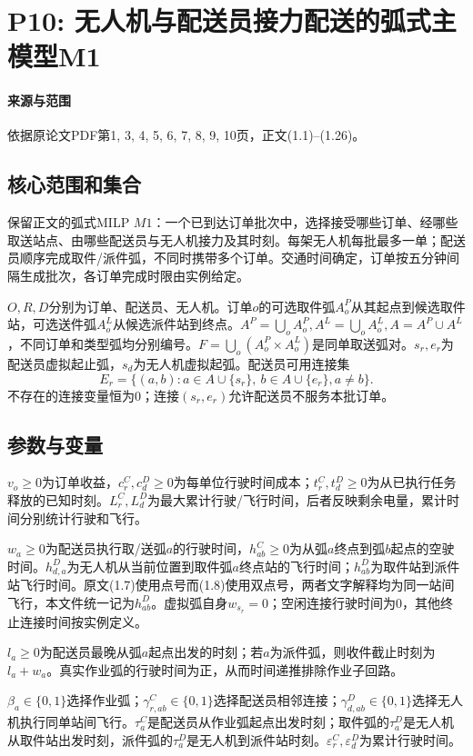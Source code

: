 \documentclass[UTF8,11pt]{ctexart}
\begin{document}
\section*{P10: 无人机与配送员接力配送的弧式主模型M1}
\paragraph{来源与范围}依据原论文PDF第1, 3, 4, 5, 6, 7, 8, 9, 10页，正文(1.1)–(1.26)。
\subsection*{核心范围和集合}
保留正文的弧式MILP $M1$：一个已到达订单批次中，选择接受哪些订单、经哪些取送站点、由哪些配送员与无人机接力及其时刻。每架无人机每批最多一单；配送员顺序完成取件/派件弧，不同时携带多个订单。交通时间确定，订单按五分钟间隔生成批次，各订单完成时限由实例给定。

$O,R,D$分别为订单、配送员、无人机。订单$o$的可选取件弧$A_o^P$从其起点到候选取件站，可选送件弧$A_o^L$从候选派件站到终点。$A^P=\bigcup_oA_o^P,A^L=\bigcup_oA_o^L,A=A^P\cup A^L$，不同订单和类型弧均分别编号。$F=\bigcup_o(A_o^P\times A_o^L)$是同单取送弧对。$s_r,e_r$为配送员虚拟起止弧，$s_d$为无人机虚拟起弧。配送员可用连接集
\[
E_r=\{(a,b):a\in A\cup\{s_r\},\ b\in A\cup\{e_r\},a\ne b\}.
\]
不存在的连接变量恒为0；连接$(s_r,e_r)$允许配送员不服务本批订单。
\subsection*{参数与变量}
$v_o\geq0$为订单收益，$c_r^C,c_d^D\geq0$为每单位行驶时间成本；$t_r^C,t_d^D\geq0$为从已执行任务释放的已知时刻。$L_r^C,L_d^D$为最大累计行驶/飞行时间，后者反映剩余电量，累计时间分别统计行驶和飞行。

$w_a\geq0$为配送员执行取/送弧$a$的行驶时间，$h_{ab}^C\geq0$为从弧$a$终点到弧$b$起点的空驶时间。$h_{d,a}^D$为无人机从当前位置到取件弧$a$终点站的飞行时间；$h_{ab}^D$为取件站到派件站飞行时间。原文(1.7)使用点号而(1.8)使用双点号，两者文字解释均为同一站间飞行，本文件统一记为$h_{ab}^D$。虚拟弧自身$w_{s_r}=0$；空闲连接行驶时间为0，其他终止连接时间按实例定义。

$l_a\geq0$为配送员最晚从弧$a$起点出发的时刻；若$a$为派件弧，则收件截止时刻为$l_a+w_a$。真实作业弧的行驶时间为正，从而时间递推排除作业子回路。

$\beta_a\in\{0,1\}$选择作业弧；$\gamma^C_{r,ab}\in\{0,1\}$选择配送员相邻连接；$\gamma^D_{d,ab}\in\{0,1\}$选择无人机执行同单站间飞行。$\tau_a^C$是配送员从作业弧起点出发时刻；取件弧的$\tau_a^D$是无人机从取件站出发时刻，派件弧的$\tau_a^D$是无人机到派件站时刻。$\varepsilon_r^C,\varepsilon_d^D$为累计行驶时间。
\end{document}
